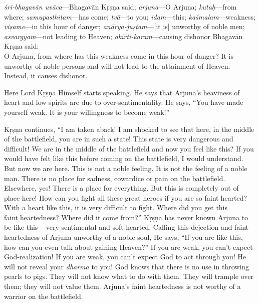 {%
  \textit{śrī-bhagavān uvāca}---Bhagavān Kṛṣṇa said; 
  \textit{arjuna}---O Arjuna; 
  \textit{kutaḥ}---from where; 
  \textit{samupasthitam}---has come; 
  \textit{tvā}---to you; 
  \textit{idam}---this; 
  \textit{kaśmalam}---weakness; 
  \textit{viṣame}---in this hour of danger; 
  \textit{anārya-juṣṭam}---[it is] unworthy of noble men; 
  \textit{asvargyam}---not leading to Heaven; 
  \textit{akīrti-karam}---causing dishonor
}
{%
  \hspace*{1em}Bhagavān Kṛṣṇa said: \\
  O Arjuna, from where has this weakness come in this hour of danger? It is unworthy of noble persons and will not lead to the attainment of Heaven. Instead, it causes dishonor.
  }

Here Lord Kṛṣṇa Himself starts speaking. He says that Arjuna’s heaviness of heart and low spirits are due to over-sentimentality. He says, “You have made yourself weak. It is your willingness to become weak!”

Kṛṣṇa continues, “I am taken aback! I am shocked to see that here, in the middle of the battlefield, you are in such a state! This state is very dangerous and difficult! We are in the middle of the battlefield and now you feel like this? If you would have felt like this before coming on the battlefield, I would understand. But now we are here. This is not a noble feeling. It is not the feeling of a noble man. There is no place for sadness, cowardice or pain on the battlefield. Elsewhere, yes! There is a place for everything. But this is completely out of place here! How can you fight all these great heroes if you are so fainthearted? With a heart like this, it is very difficult to fight. Where did you get this faintheartedness? Where did it come from?” Kṛṣṇa has never known Arjuna to be like this – very sentimental and soft-hearted. Calling this dejection and faint-heartedness of Arjuna unworthy of a noble soul, He says, “If you are like this, how can you even talk about gaining Heaven?” If you are weak, you can’t expect God-realization! If you are weak, you can’t expect God to act through you! He will not reveal your \textit{dharma} to you! God knows that there is no use in throwing pearls to pigs. They will not know what to do with them. They will trample over them; they will not value them. Arjuna’s faint heartedness is not worthy of a warrior on the battlefield.

